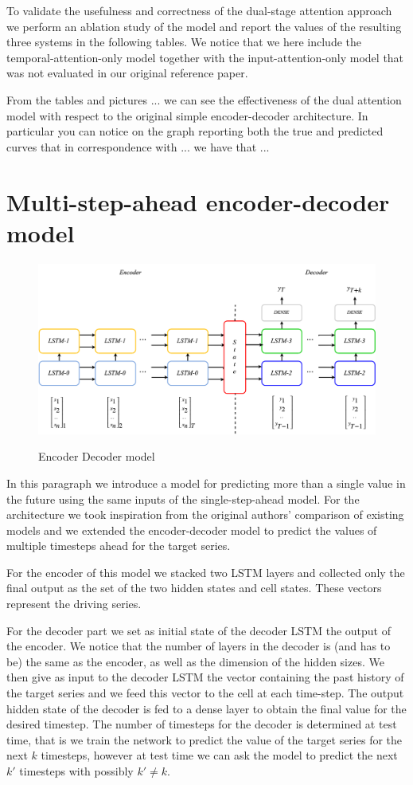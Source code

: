 \documentclass{article}
\begin{document}
To validate the usefulness and correctness of the dual-stage attention approach we
perform an ablation study of the model and report the values of the resulting 
three systems in the following tables. We notice that we here include the 
temporal-attention-only model together with the input-attention-only model that
was not evaluated in our original reference paper.

From the tables and pictures ...
we can see the effectiveness of the dual attention model with respect to the 
original simple encoder-decoder architecture. In particular you can notice on 
the graph reporting both the true and predicted curves that in correspondence 
with ... we have that ...

\section{Multi-step-ahead encoder-decoder model}

\begin{figure}[ht]
\centering
\includegraphics[width=0.9\linewidth]{ende-rnn.png} \\
\caption{Encoder Decoder model}
\label{fig:ende-rnn}
\end{figure}


In this paragraph we introduce a model for predicting more than a single value in 
the future using the same inputs of the single-step-ahead model. 
For the architecture we took inspiration from the original authors' comparison of
existing models and we extended the encoder-decoder model to predict the values
of multiple timesteps ahead for the target series.

For the encoder of this model we stacked two LSTM layers and collected only the 
final output as the set of the two hidden states and cell states. These vectors
represent the driving series.

For the decoder part we set as initial state of the decoder LSTM the output of the
encoder. We notice that the number of layers in the decoder is (and has to be) the
same as the encoder, as well as the dimension of the hidden sizes. We then give as
input to the decoder LSTM the vector containing the past history of the target 
series and we feed this vector to the cell at each time-step. The output hidden
state of the decoder is fed to a dense layer to obtain the final value for the 
desired timestep. The number of timesteps for the decoder is determined at test
time, that is we train the network to predict the value of the target series for
the next $k$ timesteps, however at test time we can ask the model to predict the 
next $k'$ timesteps with possibly $k' \ne k$.
\end{document}
